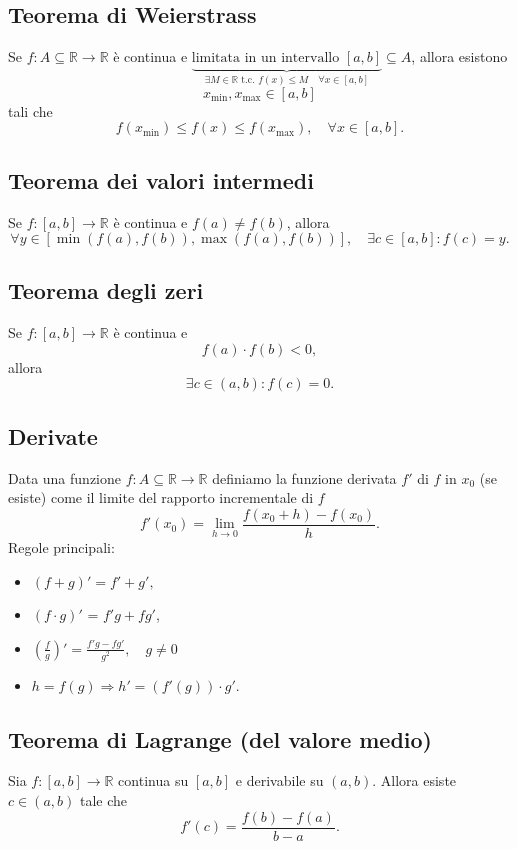 \documentclass[12pt,a4paper]{article}
\begin{document}
\subsection*{Teorema di Weierstrass}
Se \( f : A\subseteq\mathbb{R} \to \mathbb{R} \) è continua e $\underbrace{\text{limitata in un intervallo }[a,b]}_{\exists M\in\mathbb{R} \text{ t.c. } f(x)\leq M \quad \forall x \in [a,b]}\subseteq A$, allora esistono
\[
x_{\min}, x_{\max} \in [a,b]
\]
tali che
\[
f(x_{\min}) \leq f(x) \leq f(x_{\max}), \quad \forall x \in [a,b].
\]

\subsection*{Teorema dei valori intermedi}
Se \( f : [a,b] \to \mathbb{R} \) è continua e \( f(a) \neq f(b) \), allora  
\[
\forall y \in [\min(f(a),f(b)), \max(f(a),f(b))], \quad \exists c \in [a,b] : f(c) = y.
\]

\subsection*{Teorema degli zeri}
Se \( f : [a,b] \to \mathbb{R} \) è continua e
\[
f(a) \cdot f(b) < 0,
\]
allora
\[
\exists c \in (a,b) : f(c) = 0.
\]

\subsection*{Derivate}
Data una funzione $f:A\subseteq\mathbb{R}\to\mathbb{R}$ definiamo la funzione derivata $f'$ di $f$ in $x_0$ (se esiste) come il limite del rapporto incrementale di $f$
    \[
    f'(x_0) = \lim_{h \to 0} \frac{f(x_0 + h) - f(x_0)}{h}.
    \]
    Regole principali:  
    \begin{itemize}
    \item$(f + g)' = f' + g', $
    \item$(f \cdot g)'$ = $f' g + f g'$, \item$\left(\frac{f}{g}\right)' = \frac{f' g - f g'}{g^2}, \quad g \neq 0$
    \item$    h = f(g) \Rightarrow h' = (f' (g)) \cdot g'.$

\end{itemize}
\subsection*{Teorema di Lagrange (del valore medio)}
Sia \( f : [a,b] \to \mathbb{R} \) continua su \([a,b]\) e derivabile su \((a,b)\).  
Allora esiste \( c \in (a,b) \) tale che
\[
f'(c) = \frac{f(b) - f(a)}{b - a}.
\]
\end{document}
